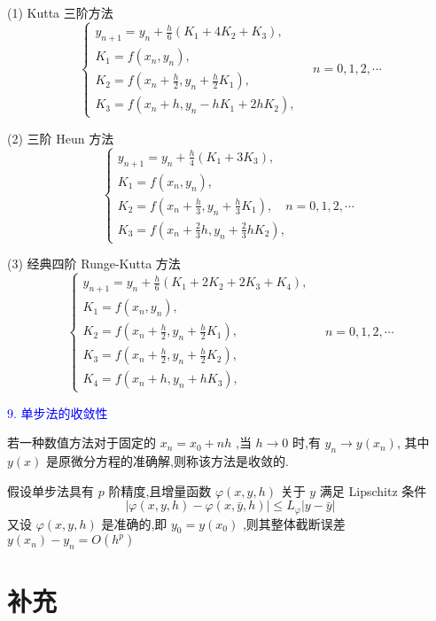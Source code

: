 (1) Kutta 三阶方法
$$\left\{\begin{array}{l} y_{n + 1} = y_{n} + \frac{h}{6}\left( K_{1} + 4K_{2} + K_{3} \right), \\ K_{1} = f\left( x_{n},y_{n} \right), \\ K_{2} = f\left( x_{n} + \frac{h}{2},y_{n} + \frac{h}{2}K_{1} \right), \\ K_{3} = f\left( x_{n} + h,y_{n} {-} hK_{1} + 2hK_{2} \right), \end{array}\quad n = 0,1,2,{\cdots} \right.$$

(2) 三阶 Heun 方法
$$\left\{\begin{array}{l} y_{n + 1} = y_{n} + \frac{h}{4}\left( K_{1} + 3K_{3} \right), \\ K_{1} = f\left( x_{n},y_{n} \right), \\ K_{2} = f\left( x_{n} + \frac{h}{3},y_{n} + \frac{h}{3}K_{1} \right),\quad n = 0,1,2,{\cdots} \\ K_{3} = f\left( x_{n} + \frac{2}{3}h,y_{n} + \frac{2}{3}hK_{2} \right), \end{array} \right.$$

(3) 经典四阶 Runge-Kutta 方法
$$\left\{\begin{array}{l} y_{n + 1} = y_{n} + \frac{h}{6}\left( K_{1} + 2K_{2} + 2K_{3} + K_{4} \right), \\ K_{1} = f\left( x_{n},y_{n} \right), \\ K_{2} = f\left( x_{n} + \frac{h}{2},y_{n} + \frac{h}{2}K_{1} \right), \\ K_{3} = f\left( x_{n} + \frac{h}{2},y_{n} + \frac{h}{2}K_{2} \right), \\ K_{4} = f\left( x_{n} + h,y_{n} + hK_{3} \right), \end{array}\quad n = 0,1,2,{\cdots} \right.$$




 \textcolor{blue}{9. 单步法的收敛性}

若一种数值方法对于固定的 $x_{n} = x_{0} + nh$ ,当 $h {\rightarrow} 0$ 时,有 $y_n\to y(x_n)$, 其中 $y(x)$ 是原微分方程的准确解,则称该方法是收敛的.

假设单步法具有 $p$ 阶精度,且增量函数 $\varphi(x,y,h)$ 关于 $y$ 满足 Lipschitz 条件
$$\left| \varphi(x,y,h) {-} \varphi\left( x,\bar{y},h \right) \right| {\leq} L_{\varphi}\left| y {-} \bar{y} \right|$$
又设 $\varphi(x,y,h)$ 是准确的,即 $y_{0} = y\left( x_{0} \right)$ ,则其整体截断误差 $y\left( x_{n} \right) {-} y_{n} = O(h^p)$


\section{补充}

